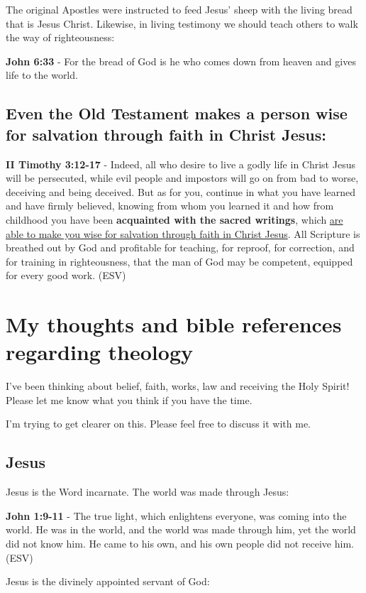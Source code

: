 \documentclass[11pt]{article}
\begin{document}
The original Apostles were instructed to feed Jesus' sheep with the living bread that is Jesus Christ. Likewise, in living testimony we should teach others to walk the way of righteousness:

\textbf{John 6:33} - For the bread of God is he who comes down from heaven and gives life to the world.

\subsection{Even the Old Testament makes a person wise for salvation through faith in Christ Jesus:}
\label{sec:orge0c04b4}

\textbf{II Timothy 3:12-17} - Indeed, all who desire to live a godly life in Christ Jesus will be persecuted, while evil people and impostors will go on from bad to worse, deceiving and being deceived. But as for you, continue in what you have learned and have firmly believed, knowing from whom you learned it and how from childhood you have been \textbf{acquainted with the sacred writings}, which \uline{are able to make you wise for salvation through faith in Christ Jesus}. All Scripture is breathed out by God and profitable for teaching, for reproof, for correction, and for training in righteousness, that the man of God may be competent, equipped for every good work. (ESV)

\section{My thoughts and bible references regarding theology}
\label{sec:org62e0049}
I've been thinking about belief, faith, works, law and receiving the Holy Spirit!
Please let me know what you think if you have the time.

I'm trying to get clearer on this.
Please feel free to discuss it with me.

\subsection{Jesus}
\label{sec:org53fca1e}
Jesus is the Word incarnate. The world was made through Jesus:

\textbf{John 1:9-11} - The true light, which enlightens everyone, was coming into the world. He was in the world, and the world was made through him, yet the world did not know him. He came to his own, and his own people did not receive him. (ESV)

Jesus is the divinely appointed servant of God:
\end{document}
